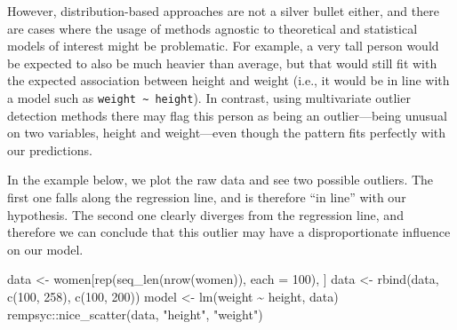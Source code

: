 \documentclass{article}
\newenvironment{Shaded}{\begin{snugshade}}{\end{snugshade}}
\newcommand{\AttributeTok}[1]{\textcolor[rgb]{0.77,0.63,0.00}{#1}}
\newcommand{\DecValTok}[1]{\textcolor[rgb]{0.00,0.00,0.81}{#1}}
\newcommand{\FunctionTok}[1]{\textcolor[rgb]{0.00,0.00,0.00}{#1}}
\newcommand{\NormalTok}[1]{#1}
\newcommand{\OtherTok}[1]{\textcolor[rgb]{0.56,0.35,0.01}{#1}}
\newcommand{\SpecialCharTok}[1]{\textcolor[rgb]{0.00,0.00,0.00}{#1}}
\newcommand{\StringTok}[1]{\textcolor[rgb]{0.31,0.60,0.02}{#1}}
\begin{document}
However, distribution-based approaches are not a silver bullet either,
and there are cases where the usage of methods agnostic to theoretical
and statistical models of interest might be problematic. For example, a
very tall person would be expected to also be much heavier than average,
but that would still fit with the expected association between height
and weight (i.e., it would be in line with a model such as
\texttt{weight\ \textasciitilde{}\ height}). In contrast, using
multivariate outlier detection methods there may flag this person as
being an outlier---being unusual on two variables, height and
weight---even though the pattern fits perfectly with our predictions.

In the example below, we plot the raw data and see two possible
outliers. The first one falls along the regression line, and is
therefore ``in line'' with our hypothesis. The second one clearly
diverges from the regression line, and therefore we can conclude that
this outlier may have a disproportionate influence on our model.

\begin{Shaded}
\begin{Highlighting}[]
\NormalTok{data }\OtherTok{\textless{}{-}}\NormalTok{ women[}\FunctionTok{rep}\NormalTok{(}\FunctionTok{seq\_len}\NormalTok{(}\FunctionTok{nrow}\NormalTok{(women)), }\AttributeTok{each =} \DecValTok{100}\NormalTok{), ]}
\NormalTok{data }\OtherTok{\textless{}{-}} \FunctionTok{rbind}\NormalTok{(data, }\FunctionTok{c}\NormalTok{(}\DecValTok{100}\NormalTok{, }\DecValTok{258}\NormalTok{), }\FunctionTok{c}\NormalTok{(}\DecValTok{100}\NormalTok{, }\DecValTok{200}\NormalTok{))}
\NormalTok{model }\OtherTok{\textless{}{-}} \FunctionTok{lm}\NormalTok{(weight }\SpecialCharTok{\textasciitilde{}}\NormalTok{ height, data)}
\NormalTok{rempsyc}\SpecialCharTok{::}\FunctionTok{nice\_scatter}\NormalTok{(data, }\StringTok{"height"}\NormalTok{, }\StringTok{"weight"}\NormalTok{)}
\end{Highlighting}
\end{Shaded}
\end{document}
